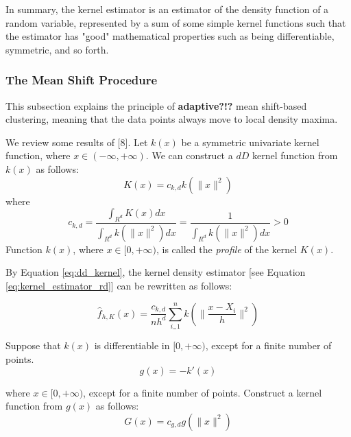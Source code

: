 In summary, the kernel estimator is an estimator of the density function of a 
random variable, represented by a sum of some simple kernel functions such that
the estimator has "good" mathematical properties such as being differentiable,
symmetric, and so forth.



\subsubsection{The Mean Shift Procedure} %
\label{ssub:the_mean_shift_procedure}
This subsection explains the principle of \textbf{adaptive?!?} mean shift-based
clustering, meaning that the data points always move to local density maxima.

We review some results of [8]. Let $k(x)$ be a symmetric univariate kernel 
function, where $x \in (-\infty, +\infty)$. We can construct a $dD$ kernel 
function from $k(x)$ as follows:
\begin{equation}\label{eq:dd_kernel}
	K(x)=c_{k,d}k(\lVert x \rVert^2)
\end{equation}
where
\begin{equation}\label{eq:kernel_constant}
	c_{k,d} = \frac{\int_{R^d} K(x) dx} {\int_{R^d} k(\lVert x \rVert^2) dx} = \frac{1}{\int_{R^d} k(\lVert x \rVert^2) dx} > 0
\end{equation}
Function $k(x)$, where $x \in [0, +\infty)$, is called the \emph{profile} of the
kernel $K(x)$. 

By Equation \eqref{eq:dd_kernel}, the kernel density estimator [see Equation \eqref{eq:kernel_estimator_rd}] can be rewritten as follows:

\begin{equation}\label{eq:label}
	\hat{f}_{h,K}(x) = \frac{c_{k,d}}{nh^d}\sum_{i_=1}^n k(\lVert \frac{x-X_i}{h} \rVert^2)
\end{equation}

Suppose that $k(x)$ is differentiable in $[0, +\infty)$, except for a finite 
number of points.
\begin{equation*}\label{eq:shadow_kernel}
	g(x) = -k\prime(x)
\end{equation*}

where $x\in [0, +\infty)$, except for a finite number of points. Construct a 
kernel function from $g(x)$ as follows:
\begin{equation*}\label{eq:shadow_kernel1}
	G(x) = c_{g,d}g(\lVert x \rVert^2)
\end{equation*}

